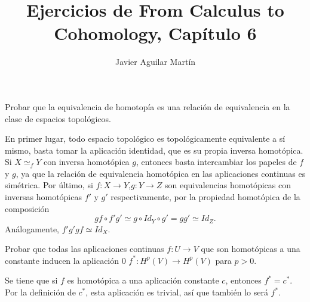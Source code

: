 \documentclass[twoside]{article}
\begin{document}
\title{Ejercicios de From Calculus to Cohomology, Capítulo 6}
\author{Javier Aguilar Martín}
\maketitle


\begin{ejercicio}{6.1}
 Probar que la equivalencia de homotopía es una relación de equivalencia en la clase de espacios topológicos.
\end{ejercicio}
\begin{solucion}
En primer lugar, todo espacio topológico es topológicamente equivalente a sí mismo, basta tomar la aplicación identidad, que es su propia inversa homotópica. Si $X\simeq_f Y$ con inversa homotópica $g$, entonces basta intercambiar los papeles de $f$ y $g$, ya que la relación de equivalencia homotópica en las aplicaciones continuas es simétrica. Por último, si $f:X\to Y$,$g:Y\to Z$ son equivalencias homotópicas con inversas homotópicas $f'$ y $g'$ respectivamente, por la propiedad homotópica de la composición
\[
g f\circ f'g'\simeq g\circ Id_Y\circ g' =gg'\simeq Id_Z.
\]
Análogamente, $f'g'gf\simeq Id_X$. 
\end{solucion}

\newpage

\begin{ejercicio}{6.2}
Probar que todas las aplicaciones continuas $f:U\to V$ que son homotópicas a una constante inducen la aplicación 0 $f^*:H^p(V)\to H^p(V)$ para $p>0$. 
\end{ejercicio}
\begin{solucion}
Se tiene que si $f$ es homotópica a una aplicación constante $c$, entonces $f^*=c^*$. Por la definición de $c^*$, esta aplicación es trivial, así que también lo será $f^*$. 
\end{solucion}
\newpage
\end{document}
